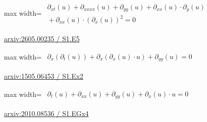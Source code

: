 \documentclass[10pt,a4paper]{article}
\begin{document}
\begin{minipage}{\linewidth}
\begin{center}\begin{adjustbox}{max width=\linewidth}$\displaystyle\begin{gathered}\begin{gathered}\partial_{xt}(u)+\partial_{xxxx}(u)+\partial_{yy}(u)+\partial_{xx}(u)\cdot \partial_{y}(u)\\[-1pt]{}+\partial_{xx}(u)\cdot (\partial_{x}(u))^{2}=0\end{gathered}\end{gathered}$\end{adjustbox}\end{center}
{\small \href{https://arxiv.org/html/2605.00235#S1.E5}{arxiv:2605.00235 / S1.E5}}\par
\end{minipage}\par\vspace{7mm}

\begin{minipage}{\linewidth}
\begin{center}\begin{adjustbox}{max width=\linewidth}$\displaystyle\begin{gathered}\begin{gathered}\partial_{x}(\partial_{t}(u))+\partial_{x}(\partial_{x}(u)\cdot u)+\partial_{yy}(u)=0\end{gathered}\end{gathered}$\end{adjustbox}\end{center}
{\small \href{https://arxiv.org/html/1505.06453#S1.Ex2}{arxiv:1505.06453 / S1.Ex2}}\par
\end{minipage}\par\vspace{7mm}

\begin{minipage}{\linewidth}
\begin{center}\begin{adjustbox}{max width=\linewidth}$\displaystyle\begin{gathered}\begin{gathered}\partial_{t}(u)+\partial_{xx}(u)+\partial_{yy}(u)+\partial_{x}(u)\cdot u=0\end{gathered}\end{gathered}$\end{adjustbox}\end{center}
{\small \href{https://arxiv.org/html/2010.08536#S1.EGx4}{arxiv:2010.08536 / S1.EGx4}}\par
\end{minipage}\par\vspace{7mm}
\end{document}
